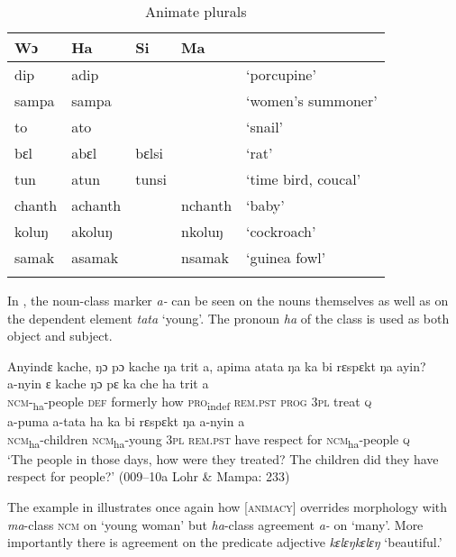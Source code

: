 \begin{table}
\caption{\label{tab:nounclass:35}Animate plurals}


\begin{tabular}{lllll}
\lsptoprule
Wɔ & Ha & Si & Ma &\\
\midrule
dip & adip &  &  & ‘porcupine'\\
sampa & sampa &  &  & ‘women's summoner'\\
to & ato &  &  & ‘snail'\\
bɛl & abɛl & bɛlsi &  & ‘rat'\\
tun & atun & tunsi &  & ‘time bird, coucal'\\
\tablevspace
chanth & achanth &  & nchanth & ‘baby'\\
koluŋ & akoluŋ &  & nkoluŋ & ‘cockroach'\\
samak & asamak &  & nsamak & ‘guinea fowl'\\
\lspbottomrule
\end{tabular}
\end{table}

In , the noun-class marker \textit{a-} can be seen on the nouns themselves as well as on the dependent element \textit{tata} ‘young'. The pronoun \textit{ha} of the class is used as both object and subject.

\ea%
    \label{ex:142}
    Anyindɛ kache, ŋɔ pɔ kache ŋa trit a, apima atata ŋa ka bi rɛspɛkt ŋa ayin?\\
    \gll a-nyin      ɛ    kache      ŋɔ    pɛ      ka      che  ha    trit    a\\
    \textsc{ncm}{}-\textsubscript{ha}{}-people  \textsc{def}  formerly    how  \textsc{pro}\textsubscript{indef}  \textsc{rem.pst}  \textsc{prog}  \textsc{3pl}  treat  \textsc{q}\\
    \gll a-puma        a-tata        ha    ka      bi    rɛspɛkt  ŋa    a-nyin      a\\
    \textsc{ncm}\textsubscript{ha}{}-children  \textsc{ncm}\textsubscript{ha}{}-young  \textsc{3pl}  \textsc{rem.pst}  have  respect  for    \textsc{ncm}\textsubscript{ha}{}-people  \textsc{q}\\
    \glt ‘The people in those days, how were they treated? The children did they have respect for people?' (009--10a Lohr \& Mampa: 233)
\z

The example in  illustrates once again how [\textsc{animacy}] overrides morphology with \textit{ma}{}-class \textsc{ncm} on ‘young woman' but \textit{ha}{}-class agreement \textit{a-} on ‘many'. More importantly there is agreement on the predicate adjective \textit{kɛlɛŋkɛlɛŋ} ‘beautiful.'

